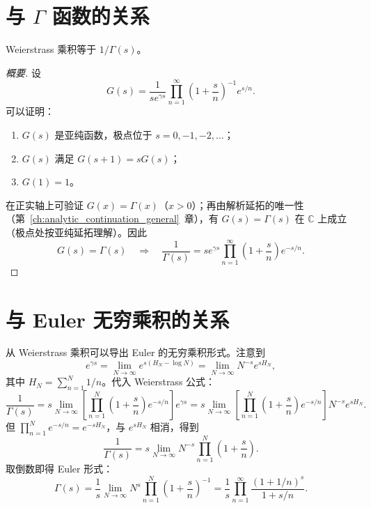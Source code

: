 \section{与 \texorpdfstring{$\Gamma$}{Gamma} 函数的关系}

\begin{theorem}{}{}
Weierstrass 乘积等于 \(1/\Gamma(s)\)。
\end{theorem}

\begin{proof}[概要]
设
\[
G(s) = \frac{1}{s e^{\gamma s}} \prod_{n=1}^\infty \left(1 + \frac{s}{n}\right)^{-1} e^{s/n}.
\]
可以证明：
\begin{enumerate}
    \item \(G(s)\) 是亚纯函数，极点位于 \(s = 0, -1, -2, \dots\)；
    \item \(G(s)\) 满足 \(G(s+1) = s G(s)\)；
    \item \(G(1) = 1\)。
\end{enumerate}
在正实轴上可验证 \(G(x)=\Gamma(x)\)（\(x>0\)）；再由解析延拓的唯一性
（第~\ref{ch:analytic_continuation_general}~章），有 \(G(s)=\Gamma(s)\) 在 \(\mathbb{C}\) 上成立
（极点处按亚纯延拓理解）。因此
\[
G(s) = \Gamma(s) \quad \Longrightarrow \quad \frac{1}{\Gamma(s)} = s e^{\gamma s} \prod_{n=1}^\infty \left(1 + \frac{s}{n}\right) e^{-s/n}.
\]
\end{proof}

\section{与 Euler 无穷乘积的关系}

从 Weierstrass 乘积可以导出 Euler 的无穷乘积形式。注意到
\[
e^{\gamma s} = \lim_{N \to \infty} e^{s(H_N - \log N)} = \lim_{N \to \infty} N^{-s} e^{s H_N},
\]
其中 \(H_N = \sum_{n=1}^N 1/n\)。代入 Weierstrass 公式：
\[
\frac{1}{\Gamma(s)} = s \lim_{N \to \infty} \left[ \prod_{n=1}^N \left(1 + \frac{s}{n}\right) e^{-s/n} \right] e^{\gamma s}
= s \lim_{N \to \infty} \left[ \prod_{n=1}^N \left(1 + \frac{s}{n}\right) e^{-s/n} \right] N^{-s} e^{s H_N}.
\]
但 \(\prod_{n=1}^N e^{-s/n} = e^{-s H_N}\)，与 \(e^{s H_N}\) 相消，得到
\[
\frac{1}{\Gamma(s)} = s \lim_{N \to \infty} N^{-s} \prod_{n=1}^N \left(1 + \frac{s}{n}\right).
\]
取倒数即得 Euler 形式：
\[
\Gamma(s) = \frac{1}{s} \lim_{N \to \infty} N^{s} \prod_{n=1}^N \left(1 + \frac{s}{n}\right)^{-1}
= \frac{1}{s} \prod_{n=1}^\infty \frac{(1+1/n)^s}{1+s/n}.
\]

